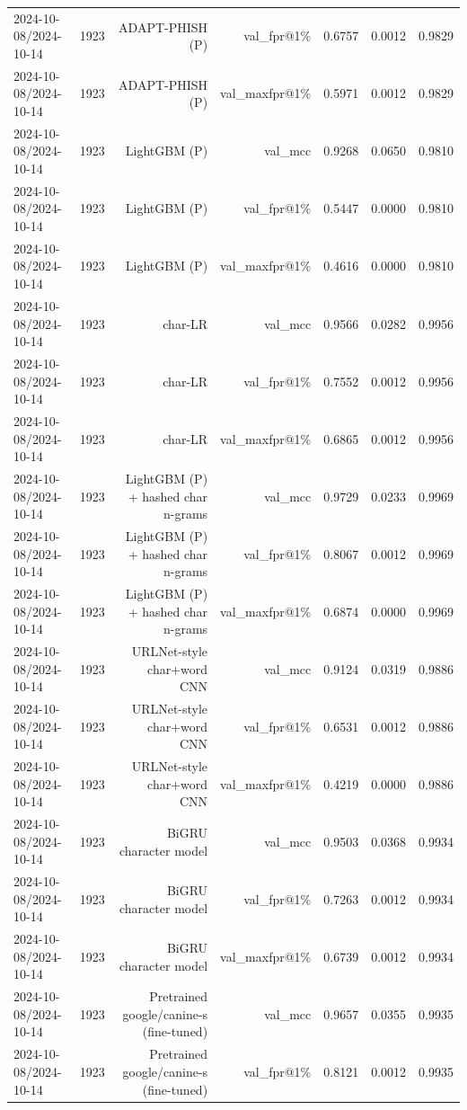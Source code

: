 \begin{table}[t]
\begin{tabular}{llrrrrr}
2024-10-08/2024-10-14 & 1923 & ADAPT-PHISH (P) & val\_fpr@1\% & 0.6757 & 0.0012 & 0.9829 \\
2024-10-08/2024-10-14 & 1923 & ADAPT-PHISH (P) & val\_maxfpr@1\% & 0.5971 & 0.0012 & 0.9829 \\
2024-10-08/2024-10-14 & 1923 & LightGBM (P) & val\_mcc & 0.9268 & 0.0650 & 0.9810 \\
2024-10-08/2024-10-14 & 1923 & LightGBM (P) & val\_fpr@1\% & 0.5447 & 0.0000 & 0.9810 \\
2024-10-08/2024-10-14 & 1923 & LightGBM (P) & val\_maxfpr@1\% & 0.4616 & 0.0000 & 0.9810 \\
2024-10-08/2024-10-14 & 1923 & char-LR & val\_mcc & 0.9566 & 0.0282 & 0.9956 \\
2024-10-08/2024-10-14 & 1923 & char-LR & val\_fpr@1\% & 0.7552 & 0.0012 & 0.9956 \\
2024-10-08/2024-10-14 & 1923 & char-LR & val\_maxfpr@1\% & 0.6865 & 0.0012 & 0.9956 \\
2024-10-08/2024-10-14 & 1923 & LightGBM (P) + hashed char n-grams & val\_mcc & 0.9729 & 0.0233 & 0.9969 \\
2024-10-08/2024-10-14 & 1923 & LightGBM (P) + hashed char n-grams & val\_fpr@1\% & 0.8067 & 0.0012 & 0.9969 \\
2024-10-08/2024-10-14 & 1923 & LightGBM (P) + hashed char n-grams & val\_maxfpr@1\% & 0.6874 & 0.0000 & 0.9969 \\
2024-10-08/2024-10-14 & 1923 & URLNet-style char+word CNN & val\_mcc & 0.9124 & 0.0319 & 0.9886 \\
2024-10-08/2024-10-14 & 1923 & URLNet-style char+word CNN & val\_fpr@1\% & 0.6531 & 0.0012 & 0.9886 \\
2024-10-08/2024-10-14 & 1923 & URLNet-style char+word CNN & val\_maxfpr@1\% & 0.4219 & 0.0000 & 0.9886 \\
2024-10-08/2024-10-14 & 1923 & BiGRU character model & val\_mcc & 0.9503 & 0.0368 & 0.9934 \\
2024-10-08/2024-10-14 & 1923 & BiGRU character model & val\_fpr@1\% & 0.7263 & 0.0012 & 0.9934 \\
2024-10-08/2024-10-14 & 1923 & BiGRU character model & val\_maxfpr@1\% & 0.6739 & 0.0012 & 0.9934 \\
2024-10-08/2024-10-14 & 1923 & Pretrained google/canine-s (fine-tuned) & val\_mcc & 0.9657 & 0.0355 & 0.9935 \\
2024-10-08/2024-10-14 & 1923 & Pretrained google/canine-s (fine-tuned) & val\_fpr@1\% & 0.8121 & 0.0012 & 0.9935 \\

\end{tabular}
\end{table}
